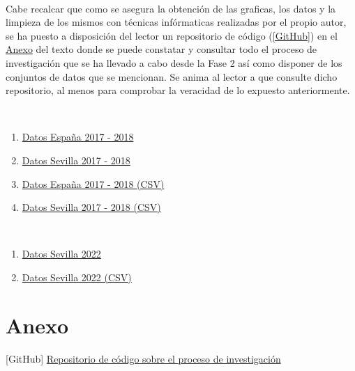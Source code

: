 \documentclass[a4paper]{article}
\begin{document}
        \ \\

        \noindent
        Cabe recalcar que como se asegura la obtención de las graficas, los datos y la limpieza de los mismos con técnicas infórmaticas realizadas por el 
        propio autor, se ha puesto a disposición del lector un repositorio de código (\hyperlink{github}{[GitHub]}) en el \hyperlink{anexo}{Anexo} 
        del texto donde se puede constatar y consultar todo el proceso de investigación que se ha llevado a cabo desde la Fase 2 así como disponer de los conjuntos de datos que se mencionan. Se anima al lector a que consulte dicho repositorio, al menos para comprobar la veracidad de lo expuesto anteriormente.

    
    \newpage

    \begin{thebibliography}{20}

            \ 
            \begin{enumerate}
                \item \href{https://datahippo.org/es/region/599216cb8a4655339b819813/}{Datos España 2017 - 2018}
                \item \href{https://datahippo.org/es/region/599230af8a46554edf884651/}{Datos Sevilla 2017 - 2018}
                \item \href{https://datahippo.org/media/regions/58612732-b2dc-433b-ab78-b8fbe5bbbb16/599216cb8a4655339b819813_airbnb.csv}{Datos España 2017 - 2018 (CSV)}
                \item \href{https://datahippo.org/media/regions/7e3f7365-8ec0-42f1-a277-9b82743b8a39/599230af8a46554edf884651_airbnb.csv}{Datos Sevilla 2017 - 2018 (CSV)}
            \end{enumerate}
        
            \
            \begin{enumerate}
                \item \href{http://insideairbnb.com/get-the-data/}{Datos Sevilla 2022}
                \item \href{http://data.insideairbnb.com/spain/andaluc%C3%ADa/sevilla/2023-03-31/visualisations/listings.csv}{Datos Sevilla 2022 (CSV)}
            \end{enumerate}

    \end{thebibliography}
    

    \section*{Anexo}
        \hypertarget{anexo}{}

        \hypertarget{github}{[GitHub] \href{https://github.com/m7pantoja/TouristRental}{Repositorio de código sobre el proceso de investigación}}
\end{document}
